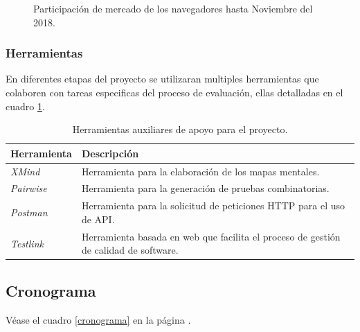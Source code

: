 \begin{figure}
\centering

\caption{Participación de mercado de los navegadores hasta Noviembre del 2018.}
\label{software}
\end{figure}

\subsubsection{Herramientas}
En diferentes etapas del proyecto se utilizaran multiples herramientas que
colaboren con tareas especificas del proceso de evaluación, ellas detalladas en
el cuadro \ref{herramientas}.

\begin{table}
\centering
\begin{tabular}{|l|l|}
\hline
\textbf{Herramienta} & \textbf{Descripción} \\
\hline
\emph{XMind} & Herramienta para la elaboración de los mapas mentales. \\
\emph{Pairwise} & Herramienta para la generación de pruebas combinatorias. \\
\emph{Postman} & Herramienta para la solicitud de peticiones HTTP para el uso de API.\\
\emph{Testlink} & Herramienta basada en web que facilita el proceso de gestión de calidad de software. \\
\hline
\end{tabular}
\caption{Herramientas auxiliares de apoyo para el proyecto.}
\label{herramientas}
\end{table}

\subsection{Cronograma}
Véase el cuadro \ref{cronograma} en la página \pageref{cronograma}.

